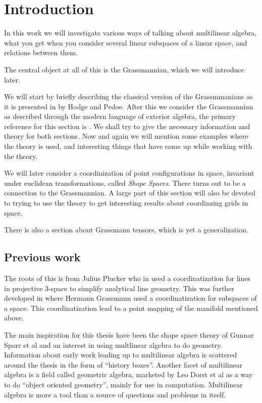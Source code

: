 \documentclass[a4paper,12pt]{book}
\theoremstyle{plain}
\theoremstyle{definition}
\begin{document}
\tableofcontents

\chapter{Introduction} %
\label{sec:introduction} 
In this work we will
investigate various ways of talking about multilinear algebra, what you get
when you consider several linear subspaces of a linear space, and relations
between them.

The central object at all of this is the Grassmannian, which we will introduce
later.

We will start by briefly describing the classical version of the Grassmmanians
as it is presented in \cite{MR0028055} by Hodge and Pedoe. After this we
consider the Grassmannian as described through the modern language of exterior
algebra, the primary reference for this section is \cite{MR1849803}. We shall
try to give the necessary information and theory for both sections. Now and
again we will mention some examples where the theory is used, and interesting
things that have come up while working with the theory.

We will later consider a coordinization of point configurations in space,
invariant under euclidean transformations, called \emph{Shape Spaces}. There
turns out to be a connection to the Grassmannian. A large part of this section
will also be devoted to trying to use the theory to get interesting results
about coordinzing grids in space.

There is also a section about Grassmann tensors, which is yet a generalization.

\section{Previous work} %
\label{sec:previous_work}
The roots of this is from Julius Plucker who in \cite{plucker1828analytisch}
used a coordinatization for lines in projective 3-space to simplify analytical
line geometry. This was further developed in \cite{gh1844} where Hermann
Grassmann used a coordinatization for subspaces of a space. This
coordinatization lead to a point mapping of the manifold mentioned above.

The main inspiration for this thesis have been the shape space theory of Gunnar
Sparr et al and an interest in using multlinear algebra to do geometry.
Information about early work leading up to multilinear algebra is scattered
around the thesis in the form of ``history boxes''. Another facet of
multilinear algebra is a field called geometric algebra, marketed by Leo Dorst
et al as a way to do ``object oriented geometry'', mainly for use in
computation.  Multilinear algebra is more a tool than a source of questions and
problems in itself.
\end{document}
